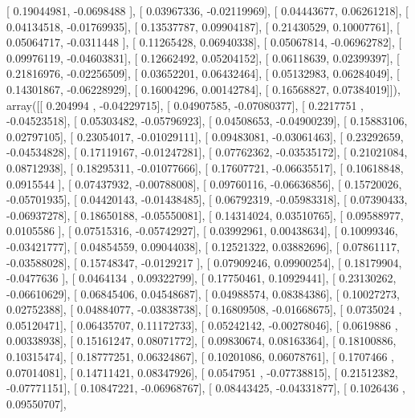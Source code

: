 \documentclass{article}
\begin{document}
       [ 0.19044981, -0.0698488 ],
       [ 0.03967336, -0.02119969],
       [ 0.04443677,  0.06261218],
       [ 0.04134518, -0.01769935],
       [ 0.13537787,  0.09904187],
       [ 0.21430529,  0.10007761],
       [ 0.05064717, -0.0311448 ],
       [ 0.11265428,  0.06940338],
       [ 0.05067814, -0.06962782],
       [ 0.09976119, -0.04603831],
       [ 0.12662492,  0.05204152],
       [ 0.06118639,  0.02399397],
       [ 0.21816976, -0.02256509],
       [ 0.03652201,  0.06432464],
       [ 0.05132983,  0.06284049],
       [ 0.14301867, -0.06228929],
       [ 0.16004296,  0.00142784],
       [ 0.16568827,  0.07384019]]), array([[ 0.204994  , -0.04229715],
       [ 0.04907585, -0.07080377],
       [ 0.2217751 , -0.04523518],
       [ 0.05303482, -0.05796923],
       [ 0.04508653, -0.04900239],
       [ 0.15883106,  0.02797105],
       [ 0.23054017, -0.01029111],
       [ 0.09483081, -0.03061463],
       [ 0.23292659, -0.04534828],
       [ 0.17119167, -0.01247281],
       [ 0.07762362, -0.03535172],
       [ 0.21021084,  0.08712938],
       [ 0.18295311, -0.01077666],
       [ 0.17607721, -0.06635517],
       [ 0.10618848,  0.0915544 ],
       [ 0.07437932, -0.00788008],
       [ 0.09760116, -0.06636856],
       [ 0.15720026, -0.05701935],
       [ 0.04420143, -0.01438485],
       [ 0.06792319, -0.05983318],
       [ 0.07390433, -0.06937278],
       [ 0.18650188, -0.05550081],
       [ 0.14314024,  0.03510765],
       [ 0.09588977,  0.0105586 ],
       [ 0.07515316, -0.05742927],
       [ 0.03992961,  0.00438634],
       [ 0.10099346, -0.03421777],
       [ 0.04854559,  0.09044038],
       [ 0.12521322,  0.03882696],
       [ 0.07861117, -0.03588028],
       [ 0.15748347, -0.0129217 ],
       [ 0.07909246,  0.09900254],
       [ 0.18179904, -0.0477636 ],
       [ 0.0464134 ,  0.09322799],
       [ 0.17750461,  0.10929441],
       [ 0.23130262, -0.06610629],
       [ 0.06845406,  0.04548687],
       [ 0.04988574,  0.08384386],
       [ 0.10027273,  0.02752388],
       [ 0.04884077, -0.03838738],
       [ 0.16809508, -0.01668675],
       [ 0.0735024 ,  0.05120471],
       [ 0.06435707,  0.11172733],
       [ 0.05242142, -0.00278046],
       [ 0.0619886 ,  0.00338938],
       [ 0.15161247,  0.08071772],
       [ 0.09830674,  0.08163364],
       [ 0.18100886,  0.10315474],
       [ 0.18777251,  0.06324867],
       [ 0.10201086,  0.06078761],
       [ 0.1707466 ,  0.07014081],
       [ 0.14711421,  0.08347926],
       [ 0.0547951 , -0.07738815],
       [ 0.21512382, -0.07771151],
       [ 0.10847221, -0.06968767],
       [ 0.08443425, -0.04331877],
       [ 0.1026436 ,  0.09550707],
\end{document}
